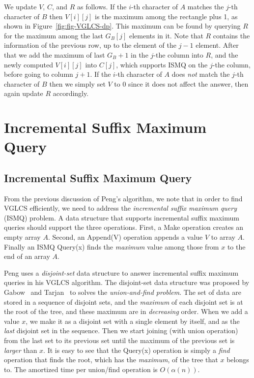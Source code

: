 We update $V$, $C$, and $R$ as follows.  If the $i$-th character of
$A$ matches the $j$-th character of $B$ then $V[i][j]$ is the maximum
among the rectangle plus 1, as shown in Figure~\ref{fig:fig-VGLCS-dp}.
This maximum can be found by querying $R$ for the maximum among the
last $G_B[j]$ elements in it.  Note that $R$ contains the information
of the previous row, up to the element of the $j-1$ element.  After
that we add the maximum of last $G_B + 1$ in the $j$-the column into
$R$, and the newly computed $V[i][j]$ into $C[j]$, which supports ISMQ
on the $j$-the column, before going to column $j + 1$.  If the $i$-th
character of $A$ does {\em not} match the $j$-th character of $B$ then
we simply set $V$ to 0 since it does not affect the answer, then again
update $R$ accordingly.
 


\ifdefined\MasterThesis
\section{Incremental Suffix Maximum Query}
\else
\subsection{Incremental Suffix Maximum Query}
\fi

From the previous discussion of Peng's algorithm, we note that in
order to find VGLCS efficiently, we need to address the {\em
  incremental suffix maximum query} (ISMQ) problem.  A data structure
that supports incremental suffix maximum queries should support the
three operations.  First, a {\sc Make} operation creates an empty
array $A$. Second, an {\sc Append(V)} operation appends a value $V$ to
array $A$. Finally an ISMQ {\sc Query(x)} finds the {\em maximum}
value among those from $x$ to the end of an array $A$.

Peng uses a {\em disjoint-set} data structure to answer incremental
suffix maximum queries in his VGLCS algorithm.  The disjoint-set data
structure was proposed by Gabow~\cite{Gabow1983ALA} and
Tarjan~\cite{Tarjan1975EfficiencyOA} to solves the {\em union-and-find
  problem}.  The set of data are stored in a sequence of disjoint
sets, and the {\em maximum} of each disjoint set is at the root of the
tree, and these maximum are in {\em decreasing} order.  When we add a
value $x$, we make it as a disjoint set with a single element by
itself, and as the {\em last} disjoint set in the sequence.  Then we
start joining (with union operation) from the last set to its previous
set until the maximum of the previous set is {\em larger} than $x$.
It is easy to see that the {\sc Query(x)} operation is simply a {\em
  find} operation that finds the root, which has the {\em maximum}, of
the tree that $x$ belongs to.  The amortized time per union/find
operation is $O(\alpha(n))$.

